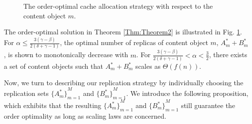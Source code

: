 \documentclass[10pt,journal,compsoc,onecolumn]{IEEEtran}
\begin{document}
\begin{figure}[t!]
    \centering
    \caption{\small{The order-optimal cache allocation strategy with respect to the content object $m$.}}
    \label{5a}
\end{figure}
The order-optimal solution in Theorem \ref{Thm:Theorem2} is illustrated in Fig. \ref{5a}. For $\alpha \leq \frac{3(\gamma-\beta)}{2(\delta+\gamma-1)}$, the optimal number of replicas of content object $m$, $A_{m}^*+B_m^*$, is shown to monotonically decrease with $m$. For $\frac{3(\gamma-\beta)}{2(\delta+\gamma-1)}< \alpha<\frac{3}{2}$, there exists a set of content objects such that $A_{m}^*+B_m^*$ scales as $\Theta(f(n))$. \par
Now, we turn to describing our replication strategy by individually choosing the replication sets ${\lbrace A_m^* \rbrace}^M_{m=1}$ and ${\lbrace B_m^* \rbrace}^M_{m=1}$. We introduce the following proposition, which exhibits that the resulting ${\lbrace A_m^* \rbrace}^M_{m=1}$ and ${\lbrace B_m^* \rbrace}^M_{m=1}$ still guarantee the order optimality as long as scaling laws are concerned.
\end{document}
